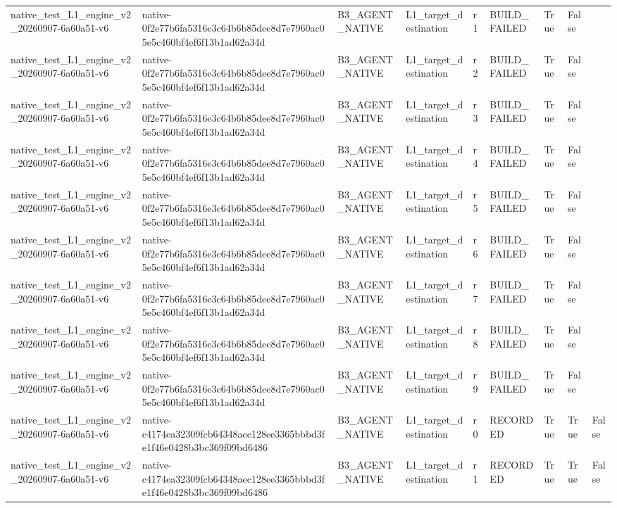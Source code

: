 \begin{tabular}{lllllllll}
native\_test\_L1\_engine\_v2\_20260907-6a60a51-v6 & native-0f2e77b6fa5316e3c64b6b85dee8d7e7960ac05e5c460bf4ef6f13b1ad62a34d & B3\_AGENT\_NATIVE & L1\_target\_destination & r1 & BUILD\_FAILED & True & False &  \\
native\_test\_L1\_engine\_v2\_20260907-6a60a51-v6 & native-0f2e77b6fa5316e3c64b6b85dee8d7e7960ac05e5c460bf4ef6f13b1ad62a34d & B3\_AGENT\_NATIVE & L1\_target\_destination & r2 & BUILD\_FAILED & True & False &  \\
native\_test\_L1\_engine\_v2\_20260907-6a60a51-v6 & native-0f2e77b6fa5316e3c64b6b85dee8d7e7960ac05e5c460bf4ef6f13b1ad62a34d & B3\_AGENT\_NATIVE & L1\_target\_destination & r3 & BUILD\_FAILED & True & False &  \\
native\_test\_L1\_engine\_v2\_20260907-6a60a51-v6 & native-0f2e77b6fa5316e3c64b6b85dee8d7e7960ac05e5c460bf4ef6f13b1ad62a34d & B3\_AGENT\_NATIVE & L1\_target\_destination & r4 & BUILD\_FAILED & True & False &  \\
native\_test\_L1\_engine\_v2\_20260907-6a60a51-v6 & native-0f2e77b6fa5316e3c64b6b85dee8d7e7960ac05e5c460bf4ef6f13b1ad62a34d & B3\_AGENT\_NATIVE & L1\_target\_destination & r5 & BUILD\_FAILED & True & False &  \\
native\_test\_L1\_engine\_v2\_20260907-6a60a51-v6 & native-0f2e77b6fa5316e3c64b6b85dee8d7e7960ac05e5c460bf4ef6f13b1ad62a34d & B3\_AGENT\_NATIVE & L1\_target\_destination & r6 & BUILD\_FAILED & True & False &  \\
native\_test\_L1\_engine\_v2\_20260907-6a60a51-v6 & native-0f2e77b6fa5316e3c64b6b85dee8d7e7960ac05e5c460bf4ef6f13b1ad62a34d & B3\_AGENT\_NATIVE & L1\_target\_destination & r7 & BUILD\_FAILED & True & False &  \\
native\_test\_L1\_engine\_v2\_20260907-6a60a51-v6 & native-0f2e77b6fa5316e3c64b6b85dee8d7e7960ac05e5c460bf4ef6f13b1ad62a34d & B3\_AGENT\_NATIVE & L1\_target\_destination & r8 & BUILD\_FAILED & True & False &  \\
native\_test\_L1\_engine\_v2\_20260907-6a60a51-v6 & native-0f2e77b6fa5316e3c64b6b85dee8d7e7960ac05e5c460bf4ef6f13b1ad62a34d & B3\_AGENT\_NATIVE & L1\_target\_destination & r9 & BUILD\_FAILED & True & False &  \\
native\_test\_L1\_engine\_v2\_20260907-6a60a51-v6 & native-c4174ea32309fcb64348aec128ee3365bbbd3fe1f46e0428b3bc369f09bd6486 & B3\_AGENT\_NATIVE & L1\_target\_destination & r0 & RECORDED & True & True & False \\
native\_test\_L1\_engine\_v2\_20260907-6a60a51-v6 & native-c4174ea32309fcb64348aec128ee3365bbbd3fe1f46e0428b3bc369f09bd6486 & B3\_AGENT\_NATIVE & L1\_target\_destination & r1 & RECORDED & True & True & False \\

\end{tabular}
